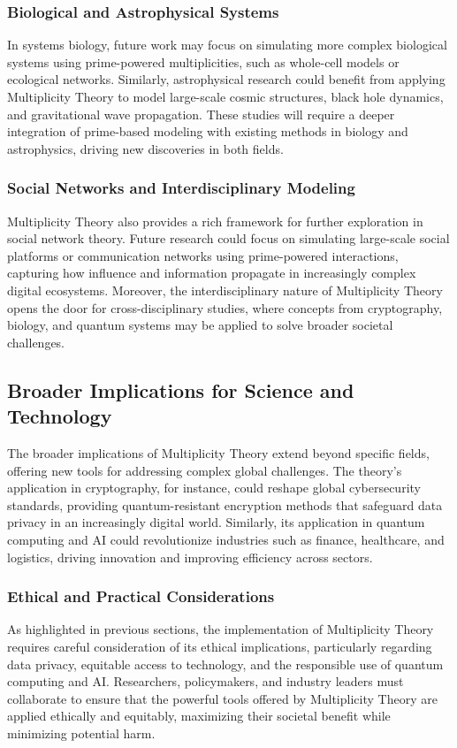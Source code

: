 \documentclass[%
 preprint, linenumbers,
 amsmath,amssymb,
 aps, physrev,
]{revtex4-2}
\begin{document}
\subsubsection{Biological and Astrophysical Systems}
In systems biology, future work may focus on simulating more complex biological systems using prime-powered multiplicities, such as whole-cell models or ecological networks. Similarly, astrophysical research could benefit from applying Multiplicity Theory to model large-scale cosmic structures, black hole dynamics, and gravitational wave propagation. These studies will require a deeper integration of prime-based modeling with existing methods in biology and astrophysics, driving new discoveries in both fields.

\subsubsection{Social Networks and Interdisciplinary Modeling}
Multiplicity Theory also provides a rich framework for further exploration in social network theory. Future research could focus on simulating large-scale social platforms or communication networks using prime-powered interactions, capturing how influence and information propagate in increasingly complex digital ecosystems. Moreover, the interdisciplinary nature of Multiplicity Theory opens the door for cross-disciplinary studies, where concepts from cryptography, biology, and quantum systems may be applied to solve broader societal challenges.

\subsection{Broader Implications for Science and Technology}
The broader implications of Multiplicity Theory extend beyond specific fields, offering new tools for addressing complex global challenges. The theory’s application in cryptography, for instance, could reshape global cybersecurity standards, providing quantum-resistant encryption methods that safeguard data privacy in an increasingly digital world. Similarly, its application in quantum computing and AI could revolutionize industries such as finance, healthcare, and logistics, driving innovation and improving efficiency across sectors.

\subsubsection{Ethical and Practical Considerations}
As highlighted in previous sections, the implementation of Multiplicity Theory requires careful consideration of its ethical implications, particularly regarding data privacy, equitable access to technology, and the responsible use of quantum computing and AI. Researchers, policymakers, and industry leaders must collaborate to ensure that the powerful tools offered by Multiplicity Theory are applied ethically and equitably, maximizing their societal benefit while minimizing potential harm.
\end{document}
